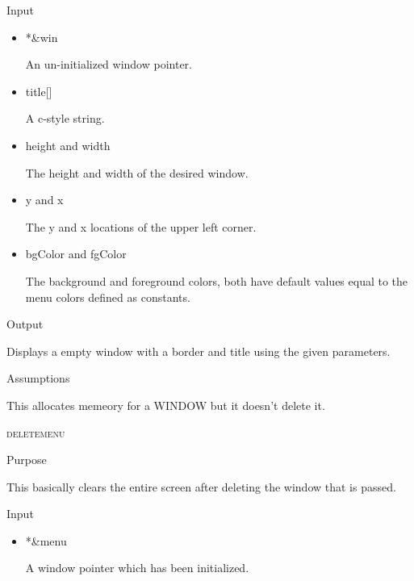 \documentclass[pdftex, 11pt]{article}
\begin{document}
\begin{description}
\begin{description}
			\item{Input}

				\begin{itemize}

					\item{*\&win}

						An un-initialized window pointer.

					\item{title[]}

						A c-style string.

					\item{height and width}

						The height and width of the desired window.

					\item{y and x}

						The y and x locations of the upper left corner.

					\item{bgColor and fgColor}

						The background and foreground colors, both have default values equal
						to the menu colors defined as constants.

				\end{itemize}

			\item{Output}

				Displays a empty window with a border and title using the
				given parameters.

			\item{Assumptions}

				This allocates memeory for a WINDOW but it doesn't delete it.

		\end{description}


	\item{\textsc{deletemenu}}

		\begin{description}
			\item{Purpose}

				This basically clears the entire screen after deleting the window that is
				passed.

			\item{Input}

				\begin{itemize}

					\item{*\&menu}

						A window pointer which has been initialized.	


\end{itemize}
\end{description}
\end{description}
\end{document}
